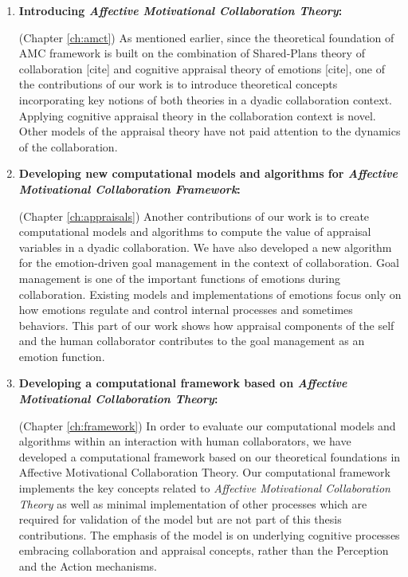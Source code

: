 \documentclass[12pt]{report}
\begin{document}
\begin{enumerate}
  \item \textbf{Introducing \textit{Affective Motivational Collaboration Theory}:}
  
  	(Chapter \ref{ch:amct}) As mentioned earlier, since the theoretical
  	foundation of AMC framework is built on the combination of Shared-Plans
  	theory of collaboration [cite] and cognitive appraisal theory of emotions
  	[cite], one of the contributions of our work is to introduce theoretical
  	concepts incorporating key notions of both theories in a dyadic collaboration
  	context. Applying cognitive appraisal theory in the collaboration context is
  	novel. Other models of the appraisal theory have not paid attention to the
  	dynamics of the collaboration.
	
  \item \textbf{Developing new computational models and algorithms for
  \textit{Affective Motivational Collaboration Framework}:}
  
	(Chapter \ref{ch:appraisals}) Another contributions of our work is to create
	computational models and algorithms to compute the value of appraisal variables
	in a dyadic collaboration. We have also developed a new algorithm for the
	emotion-driven goal management in the context of collaboration. Goal management
	is one of the important functions of emotions during collaboration. Existing
	models and implementations of emotions focus only on how emotions regulate and
	control internal processes and sometimes behaviors. This part of our work shows
	how appraisal components of the self and the human collaborator contributes to
  	the goal management as an emotion function.
  
  \item \textbf{Developing a computational framework based on \textit{Affective
  Motivational Collaboration Theory}:}

  (Chapter \ref{ch:framework}) In order to evaluate our computational models and
  algorithms within an interaction with human collaborators, we have developed
  a computational framework based on our theoretical foundations in Affective
  Motivational Collaboration Theory. Our computational framework implements the
  key concepts related to \textit{Affective Motivational Collaboration Theory}
  as well as minimal implementation of other processes which are required for
  validation of the model but are not part of this thesis contributions. The
  emphasis of the model is on underlying cognitive processes embracing
  collaboration and appraisal concepts, rather than the Perception and the
  Action mechanisms.


\end{enumerate}
\end{document}
